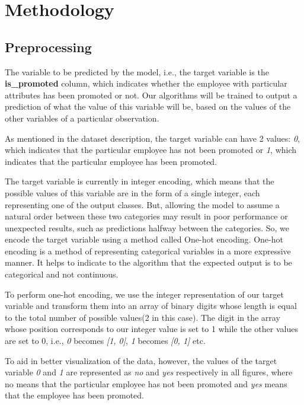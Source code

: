 \documentclass[runningheads]{llncs}
\begin{document}
\hypertarget{methodology}{%
\section{Methodology}\label{methodology}}

\hypertarget{preprocessing}{%
\subsection{Preprocessing}\label{preprocessing}}

The variable to be predicted by the model, i.e., the target variable is
the \textbf{is\_promoted} column, which indicates whether the employee
with particular attributes has been promoted or not. Our algorithms will
be trained to output a prediction of what the value of this variable
will be, based on the values of the other variables of a particular
observation.

As mentioned in the dataset description, the target variable can have 2
values: \emph{0}, which indicates that the particular employee has not
been promoted or \emph{1}, which indicates that the particular employee
has been promoted.

The target variable is currently in integer encoding, which means that
the possible values of this variable are in the form of a single
integer, each representing one of the output classes. But, allowing the
model to assume a natural order between these two categories may result
in poor performance or unexpected results, such as predictions halfway
between the categories. So, we encode the target variable using a method
called One-hot encoding. One-hot encoding is a method of representing
categorical variables in a more expressive manner. It helps to indicate
to the algorithm that the expected output is to be categorical and not
continuous.

To perform one-hot encoding, we use the integer representation of our
target variable and transform them into an array of binary digits whose
length is equal to the total number of possible values(2 in this case).
The digit in the array whose position corresponds to our integer value
is set to 1 while the other values are set to 0, i.e., \emph{0} becomes
\emph{{[}1, 0{]}}, \emph{1} becomes \emph{{[}0, 1{]}} etc.

To aid in better visualization of the data, however, the values of the
target variable \emph{0} and \emph{1} are represented as \emph{no} and
\emph{yes} respectively in all figures, where no means that the
particular employee has not been promoted and \emph{yes} means that the
employee has been promoted.
\end{document}
